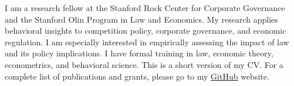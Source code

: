 

\begin{cvparagraph}

I am a research fellow at the Stanford Rock Center for Corporate Governance and the Stanford Olin Program in Law and Economics. My research applies behavioral insights to competition policy, corporate governance, and economic regulation. I am especially interested in empirically assessing the impact of law and its policy implications. I have formal training in law, economic theory, econometrics, and behavioral science. This is a short version of my CV. For a complete list of publications and grants, please go to my \href{https://omarvd.github.io}{GitHub} website.
\end{cvparagraph}